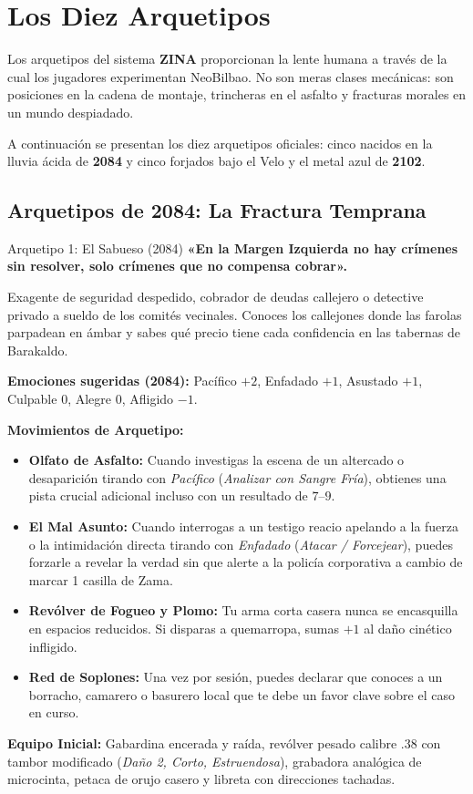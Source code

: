 \chapter{Los Diez Arquetipos}

Los arquetipos del sistema \textbf{ZINA} proporcionan la lente humana a través de la cual los jugadores experimentan NeoBilbao. No son meras clases mecánicas: son posiciones en la cadena de montaje, trincheras en el asfalto y fracturas morales en un mundo despiadado.

A continuación se presentan los diez arquetipos oficiales: cinco nacidos en la lluvia ácida de \textbf{2084} y cinco forjados bajo el Velo y el metal azul de \textbf{2102}.

\section{Arquetipos de 2084: La Fractura Temprana}

\begin{FichaArquetipo}{Arquetipo 1: El Sabueso (2084)}
\textbf{«En la Margen Izquierda no hay crímenes sin resolver, solo crímenes que no compensa cobrar».}

Exagente de seguridad despedido, cobrador de deudas callejero o detective privado a sueldo de los comités vecinales. Conoces los callejones donde las farolas parpadean en ámbar y sabes qué precio tiene cada confidencia en las tabernas de Barakaldo.

\textbf{Emociones sugeridas (2084):} Pacífico $+2$, Enfadado $+1$, Asustado $+1$, Culpable $0$, Alegre $0$, Afligido $-1$.

\textbf{Movimientos de Arquetipo:}
\begin{itemize}
    \item \textbf{Olfato de Asfalto:} Cuando investigas la escena de un altercado o desaparición tirando con \textit{Pacífico} (\textit{Analizar con Sangre Fría}), obtienes una pista crucial adicional incluso con un resultado de $7\text{--}9$.
    \item \textbf{El Mal Asunto:} Cuando interrogas a un testigo reacio apelando a la fuerza o la intimidación directa tirando con \textit{Enfadado} (\textit{Atacar / Forcejear}), puedes forzarle a revelar la verdad sin que alerte a la policía corporativa a cambio de marcar 1 casilla de Zama.
    \item \textbf{Revólver de Fogueo y Plomo:} Tu arma corta casera nunca se encasquilla en espacios reducidos. Si disparas a quemarropa, sumas $+1$ al daño cinético infligido.
    \item \textbf{Red de Soplones:} Una vez por sesión, puedes declarar que conoces a un borracho, camarero o basurero local que te debe un favor clave sobre el caso en curso.
\end{itemize}

\textbf{Equipo Inicial:} Gabardina encerada y raída, revólver pesado calibre .38 con tambor modificado (\textit{Daño 2, Corto, Estruendosa}), grabadora analógica de microcinta, petaca de orujo casero y libreta con direcciones tachadas.
\end{FichaArquetipo}

